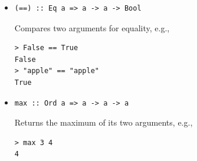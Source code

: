 \documentclass[addpoints]{exam}
\begin{document}
\begin{itemize}
\newpage

\item
\begin{verbatim}
(==) :: Eq a => a -> a -> Bool
\end{verbatim}
Compares two arguments for equality, e.g., 
\begin{verbatim}
> False == True
False
> "apple" == "apple"
True
\end{verbatim}
\item
\begin{verbatim}
max :: Ord a => a -> a -> a
\end{verbatim}
Returns the maximum of its two arguments, e.g.,
\begin{verbatim}
> max 3 4
4
\end{verbatim}
\end{itemize}
\end{document}
